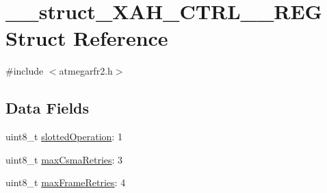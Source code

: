 \hypertarget{struct____struct___x_a_h___c_t_r_l__0___r_e_g}{\section{\-\_\-\-\_\-struct\-\_\-\-X\-A\-H\-\_\-\-C\-T\-R\-L\-\_\-\_\-\-R\-E\-G Struct Reference}
\label{struct____struct___x_a_h___c_t_r_l__0___r_e_g}
}


{\ttfamily \#include $<$atmegarfr2.\-h$>$}

\subsection*{Data Fields}
\begin{DoxyCompactItemize}
\item 
uint8\-\_\-t \hyperlink{struct____struct___x_a_h___c_t_r_l__0___r_e_g_a862d47a15cfb0d42d05ae61639c461e5}{slotted\-Operation}\-: 1
\item 
uint8\-\_\-t \hyperlink{struct____struct___x_a_h___c_t_r_l__0___r_e_g_a4579226a15b705054bad2511716d4507}{max\-Csma\-Retries}\-: 3
\item 
uint8\-\_\-t \hyperlink{struct____struct___x_a_h___c_t_r_l__0___r_e_g_ab5ee9c6ae2f9f6c80f28e70a2877d6ca}{max\-Frame\-Retries}\-: 4
\end{DoxyCompactItemize}


